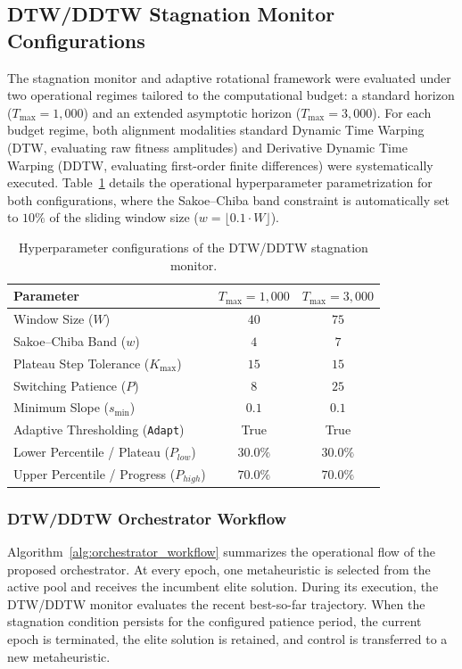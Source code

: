 \documentclass[review]{elsarticle}
\begin{document}
\subsection{DTW/DDTW Stagnation Monitor Configurations}
The stagnation monitor and adaptive rotational framework were evaluated under two operational regimes tailored to the computational budget: a standard horizon ($T_{\max} = 1,000$) and an extended asymptotic horizon ($T_{\max} = 3,000$). For each budget regime, both alignment modalities standard Dynamic Time Warping (DTW, evaluating raw fitness amplitudes) and Derivative Dynamic Time Warping (DDTW, evaluating first-order finite differences) were systematically executed. Table~\ref{tab:dtw_parameters} details the operational hyperparameter parametrization for both configurations, where the Sakoe--Chiba band constraint is automatically set to $10\%$ of the sliding window size ($w = \lfloor 0.1 \cdot W \rfloor$).
\begin{table}[htbp]
\centering
\caption{Hyperparameter configurations of the DTW/DDTW stagnation monitor.}
\label{tab:dtw_parameters}
\begin{tabular}{lcc}
\hline
\textbf{Parameter} & \textbf{$T_{\max}=1,000$} & \textbf{$T_{\max}=3,000$} \\ \hline
Window Size ($W$) & $40$ & $75$ \\
Sakoe--Chiba Band ($w$) & $4$ & $7$ \\
Plateau Step Tolerance ($K_{\max}$) & $15$ & $15$ \\
Switching Patience ($P$) & $8$ & $25$ \\
Minimum Slope ($s_{\min}$) & $0.1$ & $0.1$ \\
Adaptive Thresholding (\texttt{Adapt}) & True & True \\
Lower Percentile / Plateau ($P_{low}$) & $30.0\%$ & $30.0\%$ \\
Upper Percentile / Progress ($P_{high}$) & $70.0\%$ & $70.0\%$ \\ \hline
\end{tabular}
\end{table}

\subsubsection{DTW/DDTW Orchestrator Workflow}
\label{sec:orchestrator_workflow}

Algorithm~\ref{alg:orchestrator_workflow} summarizes the operational flow of
the proposed orchestrator. At every epoch, one metaheuristic is selected from
the active pool and receives the incumbent elite solution. During its
execution, the DTW/DDTW monitor evaluates the recent best-so-far trajectory.
When the stagnation condition persists for the configured patience period, the
current epoch is terminated, the elite solution is retained, and control is
transferred to a new metaheuristic.
\end{document}
